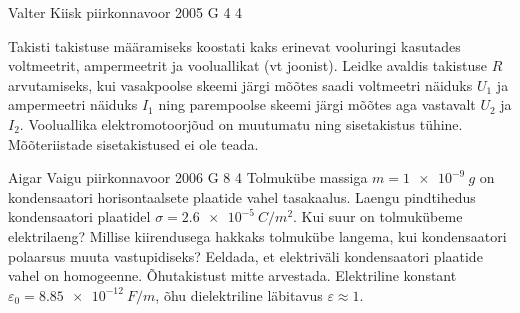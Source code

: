 \documentclass[11pt]{article}
\begin{document}
{%
{Valter Kiisk} %
{piirkonnavoor} %
{2005} %
{G 4} %
{4} %
{
\ifStatement
Takisti takistuse määramiseks koostati kaks erinevat vooluringi kasutades voltmeetrit, ampermeetrit ja vooluallikat (vt joonist). Leidke avaldis takistuse $R$ arvutamiseks, kui vasakpoolse skeemi järgi mõõtes saadi voltmeetri näiduks $U_1$ ja ampermeetri näiduks $I_1$ ning parempoolse skeemi järgi mõõtes aga vastavalt $U_2$ ja $I_2$. Vooluallika elektromotoorjõud on muutumatu ning sisetakistus tühine. Mõõteriistade sisetakistused ei ole teada.

\begin{figure}[h]
	\centering
	\hfill
\end{figure}

\fi
}

{Aigar Vaigu} %
{piirkonnavoor} %
{2006} %
{G 8} %
{4} %
{
\ifStatement
Tolmukübe massiga $m = \SI{1e-9}{g}$ on kondensaatori horisontaalsete plaatide vahel tasakaalus. Laengu pindtihedus kondensaatori plaatidel $\sigma = \SI{2,6e-5}{C/m^2}$. Kui suur on tolmukübeme elektrilaeng? Millise kiirendusega hakkaks tolmukübe langema, kui kondensaatori polaarsus muuta vastupidiseks? Eeldada, et elektriväli kondensaatori plaatide vahel on homogeenne. Õhutakistust mitte arvestada. Elektriline konstant $\varepsilon_0 = \SI{8,85e-12}{F/m}$, õhu dielektriline läbitavus $\varepsilon \approx 1$.
\fi
}

}
\end{document}
